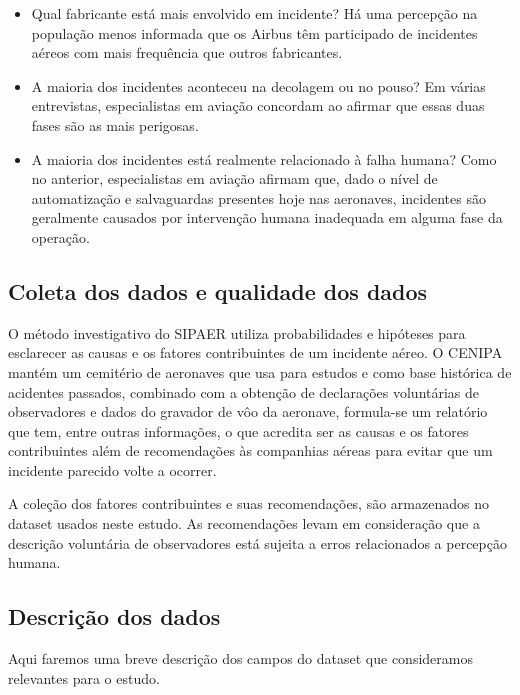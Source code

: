 \documentclass[conference]{IEEEtran}
\begin{document}
\begin{itemize}
 \item Qual fabricante está mais envolvido em incidente? Há uma percepção na população menos informada que os Airbus têm participado de incidentes aéreos com mais frequência
 que outros fabricantes.
 \item A maioria dos incidentes aconteceu na decolagem ou no pouso? Em várias entrevistas, especialistas em aviação concordam ao afirmar que essas duas fases são as
 mais perigosas.
 \item A maioria dos incidentes está realmente relacionado à falha humana? Como no anterior, especialistas em aviação afirmam que, dado o nível de automatização e salvaguardas 
 presentes hoje nas aeronaves, incidentes são geralmente causados por intervenção humana inadequada em alguma fase da operação.
\end{itemize}


\subsection{Coleta dos dados e qualidade dos dados}

O método investigativo do SIPAER utiliza probabilidades e hipóteses para esclarecer as causas e os fatores contribuintes de um incidente aéreo. O CENIPA mantém um 
cemitério de aeronaves que usa para estudos e como base histórica de acidentes passados, combinado com a obtenção de declarações voluntárias de observadores e dados do 
gravador de vôo da aeronave, formula-se um relatório que tem, entre outras informações, o que acredita ser as causas e os fatores contribuintes além de recomendações
às companhias aéreas para evitar que um incidente parecido volte a ocorrer.

A coleção dos fatores contribuintes e suas recomendações, são armazenados no dataset usados neste estudo. As recomendações levam em consideração que a descrição voluntária
de observadores está sujeita a erros relacionados a percepção humana.

\subsection{Descrição dos dados}

Aqui faremos uma breve descrição dos campos do dataset que consideramos relevantes para o estudo.\\
\end{document}

